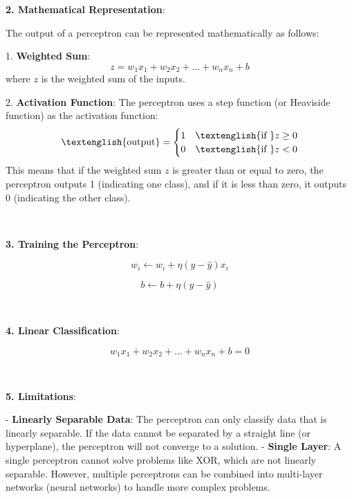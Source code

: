 \documentclass{article}
\renewcommand\text[1]{\textnormal{\textenglish{#1}}}
\newenvironment{cheatformula}[1][כותרת]{
    \begin{minipage}{\linewidth}
    \textbf{#1}:
}{
    \end{minipage}\\[2ex]
}
\begin{document}
\begin{multicols*}{2}
\begin{cheatformula}[2. Mathematical Representation]
The output of a perceptron can be represented mathematically as follows:

1. \textbf{Weighted Sum}:
   \begin{equation}
   z = w_1x_1 + w_2x_2 + \ldots + w_nx_n + b
   \end{equation}
   where $z$ is the weighted sum of the inputs.

2. \textbf{Activation Function}:
   The perceptron uses a step function (or Heaviside function) as the activation function:
   \begin{equation}
   \text{output} = 
   \begin{cases} 
   1 & \text{if } z \geq 0 \\
   0 & \text{if } z < 0 
   \end{cases}
   \end{equation}
   This means that if the weighted sum $z$ is greater than or equal to zero, the perceptron outputs 1 (indicating one class), and if it is less than zero, it outputs 0 (indicating the other class).
\end{cheatformula}

\begin{cheatformula}[3. Training the Perceptron]

\begin{equation}
w_i \leftarrow w_i + \eta (y - \hat{y}) x_i
\end{equation}

\begin{equation}
b \leftarrow b + \eta (y - \hat{y})
\end{equation}

\end{cheatformula}

\begin{cheatformula}[4. Linear Classification]

\begin{equation}
w_1x_1 + w_2x_2 + \ldots + w_nx_n + b = 0
\end{equation}

\end{cheatformula}

\begin{cheatformula}[5. Limitations]

- \textbf{Linearly Separable Data}: The perceptron can only classify data that is linearly separable. If the data cannot be separated by a straight line (or hyperplane), the perceptron will not converge to a solution.
- \textbf{Single Layer}: A single perceptron cannot solve problems like XOR, which are not linearly separable. However, multiple perceptrons can be combined into multi-layer networks (neural networks) to handle more complex problems.
\end{cheatformula}

\end{multicols*}
\newpage
\end{document}
